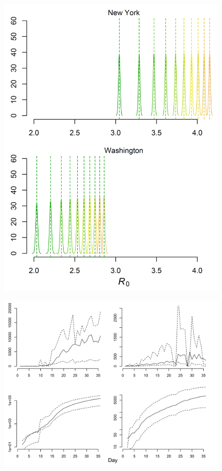 \documentclass[11pt]{article}
\begin{document}
\begin{figure}
\centering
\hspace*{0cm}\includegraphics[width=12cm]{posteriors.png}
\caption{}
\label{fig:bends}
\end{figure} 

\begin{figure}
\centering
\hspace*{0cm}\includegraphics[width=14cm]{NY_WA_up_dn.png}
\caption{}
\label{fig:bends}
\end{figure} 
\end{document}
